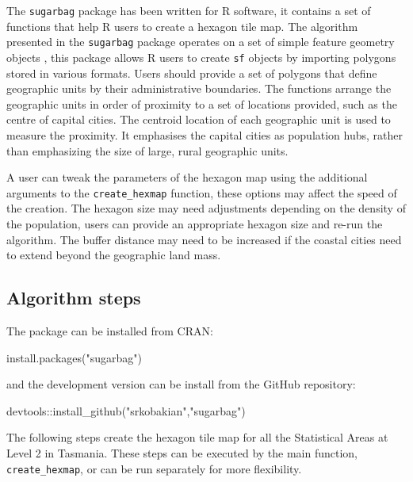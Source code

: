 The \texttt{sugarbag} package has been written for R software, it
contains a set of functions that help R users to create a hexagon tile
map. The algorithm presented in the \texttt{sugarbag} package operates
on a set of simple feature geometry objects \citep{sf}, this package
allows R users to create \texttt{sf} objects by importing polygons
stored in various formats. Users should provide a set of polygons that
define geographic units by their administrative boundaries. The
functions arrange the geographic units in order of proximity to a set of
locations provided, such as the centre of capital cities. The centroid
location of each geographic unit is used to measure the proximity. It
emphasises the capital cities as population hubs, rather than
emphasizing the size of large, rural geographic units.

A user can tweak the parameters of the hexagon map using the additional
arguments to the \texttt{create\_hexmap} function, these options may
affect the speed of the creation. The hexagon size may need adjustments
depending on the density of the population, users can provide an
appropriate hexagon size and re-run the algorithm. The buffer distance
may need to be increased if the coastal cities need to extend beyond the
geographic land mass.

\hypertarget{algorithm-steps}{%
\subsection{Algorithm steps}\label{algorithm-steps}}

The package can be installed from CRAN:

\begin{Schunk}
\begin{Sinput}
install.packages("sugarbag")
\end{Sinput}
\end{Schunk}

and the development version can be install from the GitHub repository:

\begin{Schunk}
\begin{Sinput}
devtools::install_github("srkobakian","sugarbag")
\end{Sinput}
\end{Schunk}

The following steps create the hexagon tile map for all the Statistical
Areas at Level 2 in Tasmania. These steps can be executed by the main
function, \texttt{create\_hexmap}, or can be run separately for more
flexibility.

